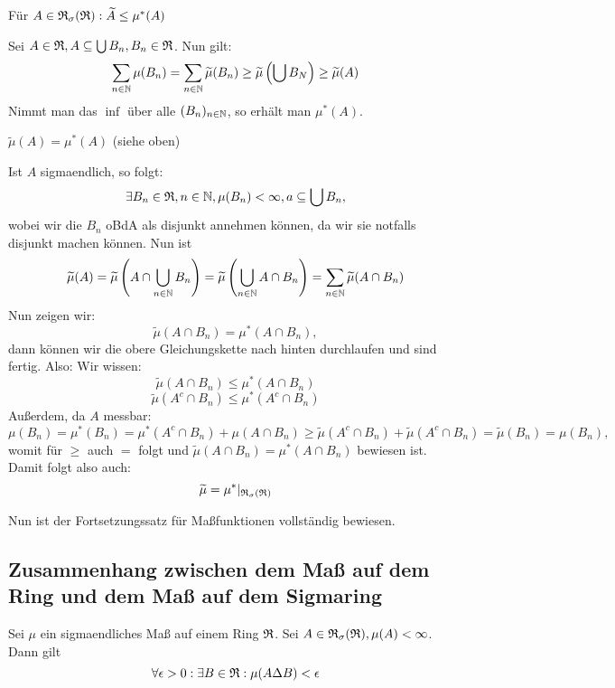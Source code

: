 			\begin{satz}
				Für $A\in\mathfrak{R}_\sigma(\mathfrak{R}): \widetilde{A}\le \mu^*(A)$
			\end{satz}
			
			\begin{bew}
				Sei $A\in\mathfrak{R}, A\subseteq \bigcup B_n, B_n\in\mathfrak{R}$. Nun gilt:
				\[ \sum_{n\in\mathbb{N}}\mu(B_n)=\sum_{n\in\mathbb{N}} \widetilde{\mu}(B_n)\ge \widetilde{\mu}\left(\bigcup B_N\right)\ge \widetilde{\mu}(A) \]
				Nimmt man das $\inf$ über alle $(B_n)_{n\in\mathbb{N}}$, so erhält man $\mu^*(A)$.
			\end{bew}
			
			\begin{satz}
				$\widetilde{\mu}(A)=\mu^*(A)$ (siehe oben)
			\end{satz}
			
			\begin{bew}
				Ist $A$ sigmaendlich, so folgt:
				\[ \exists B_n\in\mathfrak{R}, n\in\mathbb{N}, \mu(B_n)<\infty, a\subseteq \bigcup B_n, \]
				wobei wir die $B_n$ oBdA als disjunkt annehmen können, da wir sie notfalls disjunkt machen können.\newline
				Nun ist
				\[ \widetilde{\mu}(A)=\widetilde{\mu}\left(A\cap\bigcup_{n\in\mathbb{N}}B_n\right)=\widetilde{\mu}\left(\bigcup_{n\in\mathbb{N}}A\cap B_n\right)=\sum_{n\in\mathbb{N}} \widetilde{\mu}(A\cap B_n) \]
				Nun zeigen wir:
				\[ \widetilde{\mu}(A\cap B_n)=\mu^*(A\cap B_n), \]
				dann können wir die obere Gleichungskette nach hinten durchlaufen und sind fertig.\newline
				Also: Wir wissen: 
				\[ \widetilde{\mu}(A\cap B_n)\le \mu^*(A\cap B_n) \]
				\[ \widetilde{\mu}(A^c\cap B_n)\le\mu^*(A^c\cap B_n) \]
				Außerdem, da $A$ messbar:
				\[ \mu(B_n)=\mu^*(B_n)=\mu^*(A^c\cap B_n)+\mu(A\cap B_n)\ge \widetilde{\mu}(A^c\cap B_n)+\widetilde{\mu}(A^c\cap B_n)=\widetilde{\mu}(B_n)=\mu(B_n), \]
				womit für $\ge$ auch $=$ folgt und $\widetilde{\mu}(A\cap B_n)=\mu^*(A\cap B_n)$ bewiesen ist. Damit folgt also auch:\[ \widetilde{\mu}=\mu^*|_{\mathfrak{R}_\sigma(\mathfrak{R})} \]
			\end{bew}
			
			\begin{bem}
				Nun ist der Fortsetzungssatz für Maßfunktionen vollständig bewiesen.
			\end{bem}
			
			\subsection{Zusammenhang zwischen dem Maß auf dem Ring und dem Maß auf dem Sigmaring}
			\begin{satz} [Approximationstheorem I]
				Sei $\mu$ ein sigmaendliches Maß auf einem Ring $\mathfrak{R}$. Sei $A\in\mathfrak{R}_\sigma(\mathfrak{R}), \mu(A)<\infty$. Dann gilt
				\[ \forall \epsilon>0: \exists B\in\mathfrak{R}: \mu(A\Delta B)<\epsilon \]
			\end{satz}
			

